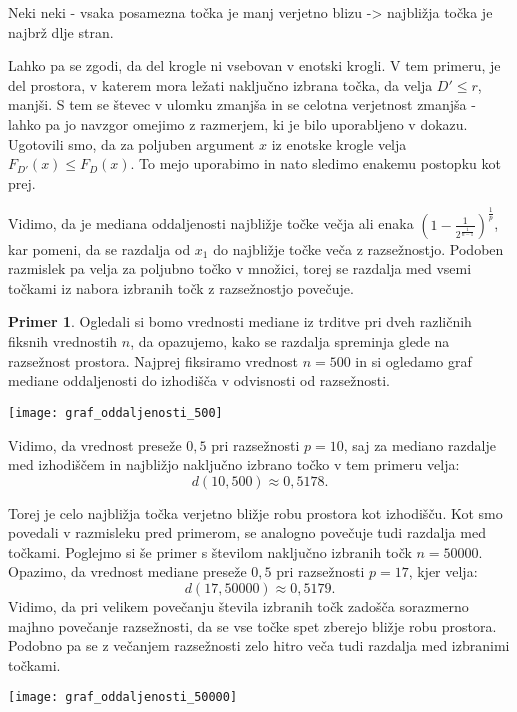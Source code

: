 \documentclass[12pt,a4paper,twoside]{article}
\theoremstyle{definition} %
\newtheorem{primer}[definicija]{Primer}
\theoremstyle{plain} %
\numberwithin{equation}{section}  %
\begin{document}
Neki neki - vsaka posamezna točka je manj verjetno blizu -> najbližja točka je najbrž dlje stran.

Lahko pa se zgodi, da del krogle ni vsebovan v enotski krogli. 
V tem primeru, je del prostora, v katerem mora ležati naključno izbrana točka, da velja $D' \leq r$, manjši. 
S tem se števec v ulomku zmanjša in se celotna verjetnost zmanjša - lahko pa jo navzgor omejimo z razmerjem, ki je bilo uporabljeno v dokazu. 
Ugotovili smo, da za poljuben argument $x$ iz enotske krogle velja $F_{D'}(x) \leq F_D(x)$. To mejo uporabimo in nato sledimo enakemu postopku kot prej.

Vidimo, da je mediana oddaljenosti najbližje točke večja ali enaka $(1 - \frac{1}{2^{\frac{1}{n-1}}})^{\frac{1}{p}}$, kar pomeni, 
da se razdalja od $x_1$ do najbližje točke veča z razsežnostjo. 
Podoben razmislek pa velja za poljubno točko v množici, torej se razdalja med vsemi točkami iz nabora izbranih točk z razsežnostjo povečuje.

\begin{primer}
Ogledali si bomo vrednosti mediane iz trditve pri dveh različnih fiksnih vrednostih $n$, da opazujemo, kako se razdalja spreminja glede na razsežnost prostora. Najprej fiksiramo vrednost $n=500$ in si ogledamo graf mediane oddaljenosti do izhodišča v odvisnosti od razsežnosti.

\begin{center}
\texttt{[image: graf\_oddaljenosti\_500]}
\end{center}

Vidimo, da vrednost preseže $0,5$ pri razsežnosti $p=10$, saj za mediano razdalje med izhodiščem in najbližjo naključno izbrano točko v tem primeru velja:
\[
d(10,500) \approx 0,5178.
\]

Torej je celo najbližja točka verjetno bližje robu prostora kot izhodišču. 
Kot smo povedali v razmisleku pred primerom, se analogno povečuje tudi razdalja med točkami. 
Poglejmo si še primer s številom naključno izbranih točk $n=50000$. Opazimo, da vrednost mediane preseže $0,5$ pri razsežnosti $p=17$, kjer velja:
\[
d(17,50000) \approx 0,5179.
\]
Vidimo, da pri velikem povečanju števila izbranih točk zadošča sorazmerno majhno povečanje razsežnosti, da se vse točke spet zberejo bližje robu prostora. 
Podobno pa se z večanjem razsežnosti zelo hitro veča tudi razdalja med izbranimi točkami.

\begin{center}
\texttt{[image: graf\_oddaljenosti\_50000]}
\end{center}

\end{primer}
\end{document}

